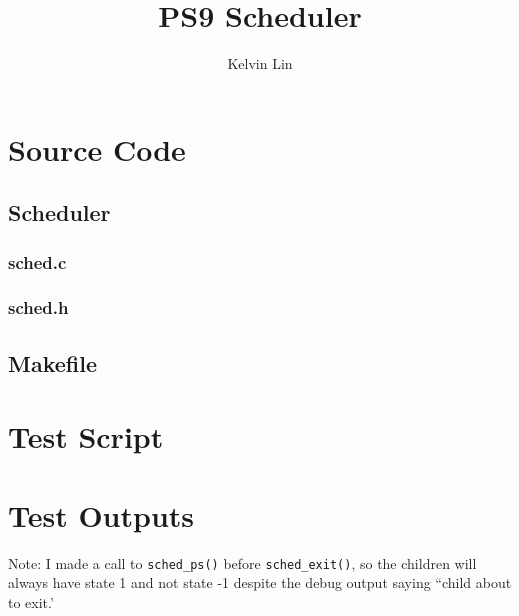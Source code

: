 \documentclass[12pt]{article}
\title{PS9 Scheduler}
\author{Kelvin Lin}
\begin{document}
\maketitle

\section{Source Code}

\subsection{Scheduler}

\subsubsection{sched.c}


\subsubsection{sched.h}


\subsection{Makefile}


\section{Test Script}


\section {Test Outputs}
Note: I made a call to \lstinline{sched_ps()} before \lstinline{sched_exit()}, so the children will always have state 1 and not state -1 despite the debug output saying ``child about to exit.'

\end{document}
